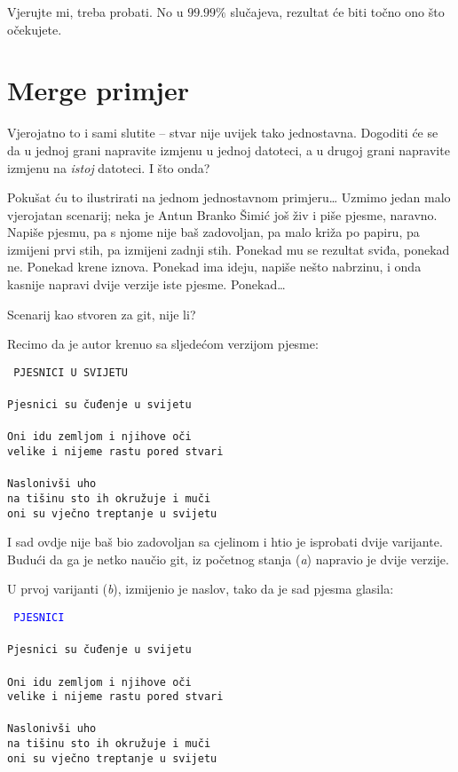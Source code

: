 Vjerujte mi, treba probati.
No u $99.99\%$ slučajeva, rezultat će biti točno ono što očekujete.

\section*{Merge primjer}

Vjerojatno to i sami slutite -- stvar nije uvijek tako jednostavna.
Dogoditi će se da u jednoj grani napravite izmjenu u jednoj datoteci, a u drugoj grani napravite izmjenu na \emph{istoj} datoteci.
I što onda?

Pokušat ću to ilustrirati na jednom jednostavnom primjeru\dots
Uzmimo jedan malo vjerojatan scenarij; neka je Antun Branko Šimić još živ i piše pjesme, naravno.
Napiše pjesmu, pa s njome nije baš zadovoljan, pa malo križa po papiru, pa izmijeni prvi stih, pa izmijeni zadnji stih.
Ponekad mu se rezultat sviđa, ponekad ne.
Ponekad krene iznova.
Ponekad ima ideju, napiše nešto nabrzinu, i onda kasnije napravi dvije verzije iste pjesme.
Ponekad\dots

Scenarij kao stvoren za git, nije li?

Recimo da je autor krenuo sa sljedećom verzijom pjesme:

\vspace{5mm}
\noindent\texttt{%
PJESNICI U SVIJETU\\%
\\%
Pjesnici su čuđenje u svijetu\\%
\\%
Oni idu zemljom i njihove oči\\%
velike i nijeme rastu pored stvari\\%
\\%
Naslonivši uho\\%
na tišinu sto ih okružuje i muči\\%
oni su vječno treptanje u svijetu}
\vspace{5mm}

I sad ovdje nije baš bio zadovoljan sa cjelinom i htio je isprobati dvije varijante.
Budući da ga je netko naučio git, iz početnog stanja (\emph a) napravio je dvije verzije.



U prvoj varijanti (\emph b), izmijenio je naslov, tako da je sad pjesma glasila:

\vspace{5mm}
\noindent\texttt{%
\textcolor{blue}{PJESNICI}\\%
\\%
Pjesnici su čuđenje u svijetu\\%
\\%
Oni idu zemljom i njihove oči\\%
velike i nijeme rastu pored stvari\\%
\\%
Naslonivši uho\\%
na tišinu sto ih okružuje i muči\\%
oni su vječno treptanje u svijetu}
\vspace{5mm}

